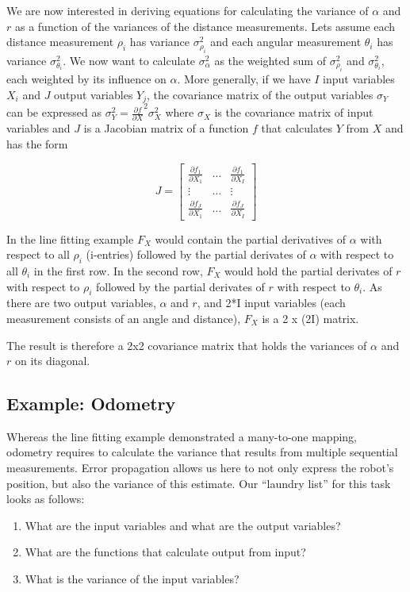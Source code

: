 We are now interested in deriving equations for calculating the variance of $ \alpha$ and $ r$ as a function of the variances of the distance measurements. Lets assume each distance measurement $ \rho_i$ has variance $ \sigma^2_{\rho_i}$ and each angular measurement $ \theta_i$ has variance $ \sigma^2_{\theta_i}$. We now want to calculate $ \sigma^2_{\alpha}$ as the weighted sum of  $ \sigma^2_{\rho_i}$ and $ \sigma^2_{\theta_i}$, each weighted by its influence on $ \alpha$.
More generally, if we have $ I$ input variables $ X_i$ and $ J$ output variables $Y_j$, the covariance matrix of the output variables $ \sigma_Y$ can be expressed as $\sigma_Y^2=\frac{\partial f}{\partial X}^2 \sigma_X^2$ where $\sigma_X$ is the covariance matrix of input variables and $J$ is a Jacobian matrix of a function $ f$ that calculates $Y$ from $X$ and has the form

\begin{equation}
J=\left[
\begin{array}{ccc}
  \frac{\partial f_1}{\partial X_1} & \ldots & \frac{\partial f_1}{\partial X_I}\\
  \vdots & \ldots & \vdots\\
  \frac{\partial f_J}{\partial X_1} & \ldots & \frac{\partial f_J}{\partial X_I}
 \end{array}
 \right]
\end{equation}

In the line fitting example $ F_X$ would contain the partial derivatives of $ \alpha$ with respect to all $ \rho_i$ (i-entries) followed by the partial derivates of $ \alpha$ with respect to all $ \theta_i$ in the first row. In the second row, $ F_X$ would hold the partial derivates of $ r$ with respect to $ \rho_i$ followed by the partial derivates of $ r$ with respect to $ \theta_i$. As there are two output variables, $ \alpha$ and $ r$, and 2*I input variables (each measurement consists of an angle and distance), $ F_X$ is a 2 x (2I) matrix.

The result is therefore a 2x2 covariance matrix that holds the variances of $ \alpha$ and $ r$ on its diagonal.

\subsection{Example: Odometry}
Whereas the line fitting example demonstrated a many-to-one mapping, odometry requires to calculate the variance that results from multiple sequential measurements.  Error propagation allows us here to not only express the robot's position, but also the variance of this estimate. Our ``laundry list'' for this task looks as follows:
\begin{enumerate}
\item What are the input variables and what are the output variables?
\item What are the functions that calculate output from input?
\item What is the variance of the input variables?
\end{enumerate}

